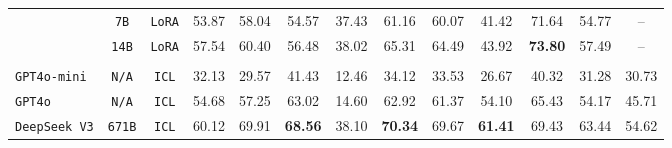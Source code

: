 \begin{table*}[tb!]
{\begin{NiceTabular}{lccccccccc;c;c|>{}c}
                                                            & \texttt{7B}                   & \texttt{LoRA}                   & 53.87                                              & 58.04          & 54.57          & 37.43          & 61.16          & 60.07          & 41.42          & 71.64                            & 54.77                         & --                     \\
                                                                                            & \texttt{14B}                  & \texttt{LoRA}                   & 57.54                                              & 60.40          & 56.48          & 38.02          & 65.31          & 64.49          & 43.92          & \textbf{73.80}                   & 57.49                         & --                     \\
            \midrule
                                             &                               &                                                                                                                                                                                                                                                                                        \\
            \midrule
            \texttt{GPT4o-mini}                                                             & \texttt{N/A}                  & \texttt{ICL}                    & 32.13                                              & 29.57          & 41.43          & 12.46          & 34.12          & 33.53          & 26.67          & 40.32                            & 31.28                         & 30.73                  \\
            \texttt{GPT4o}                                                                  & \texttt{N/A}                  & \texttt{ICL}                    & 54.68                                              & 57.25          & 63.02          & 14.60          & 62.92          & 61.37          & 54.10          & 65.43                            & 54.17                         & 45.71                  \\
            \texttt{DeepSeek\,V3}                                                           & \texttt{671B}                 & \texttt{ICL}                    & 60.12                                              & 69.91          & \textbf{68.56} & 38.10          & \textbf{70.34} & 69.67          & \textbf{61.41} & 69.43                            & 63.44                         & 54.62                  \\

\end{NiceTabular}}
\end{table*}
